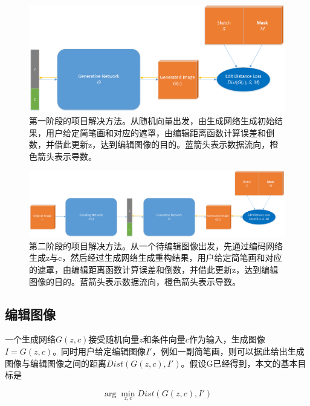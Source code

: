 \documentclass{article}
\begin{document}
\begin{figure}
  \centering
  \includegraphics[width=1\linewidth]{figs/workflow1.png}
  \caption{第一阶段的项目解决方法。从随机向量出发，由生成网络生成初始结果，用户给定简笔画和对应的遮罩，由编辑距离函数计算误差和倒数，并借此更新z，达到编辑图像的目的。蓝箭头表示数据流向，橙色箭头表示导数。}
  \label{fig:workflow1}
\end{figure}

\begin{figure}
  \centering
  \includegraphics[width=1\linewidth]{figs/workflow2.png}
  \caption{第二阶段的项目解决方法。从一个待编辑图像出发，先通过编码网络生成z与c，然后经过生成网络生成重构结果，用户给定简笔画和对应的遮罩，由编辑距离函数计算误差和倒数，并借此更新z，达到编辑图像的目的。蓝箭头表示数据流向，橙色箭头表示导数。}
  \label{fig:workflow2}
\end{figure}

\subsection{编辑图像}

一个生成网络$G(z, c)$接受随机向量$z$和条件向量$c$作为输入，生成图像$I = G(z, c)$。同时用户给定编辑图像$I'$，例如一副简笔画，则可以据此给出生成图像与编辑图像之间的距离$Dist(G(z, c), I')$。假设G已经得到，本文的基本目标是

\begin{equation}
  \arg\min_{z, c} Dist(G(z, c), I')
\end{equation}

\end{document}
